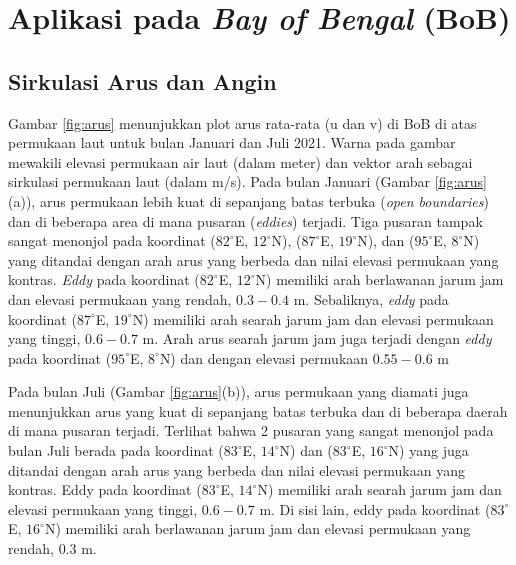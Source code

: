 \vspace{1.5pc}
\section[Aplikasi pada \textit{Bay of Bengal} (BoB)]{Aplikasi pada \textit{Bay of Bengal}  (BoB)}
\begin{spacing}{1.5}
\vspace{-1pc}
\subsection[Sirkulasi Arus dan Angin]{Sirkulasi Arus dan Angin}
	
	Gambar \ref{fig:arus} menunjukkan plot arus rata-rata (u dan v) di BoB di atas permukaan laut untuk bulan Januari dan Juli 2021. Warna pada gambar mewakili elevasi permukaan air laut (dalam meter) dan vektor arah sebagai sirkulasi permukaan laut (dalam m/s). Pada bulan Januari (Gambar \ref{fig:arus}(a)), arus permukaan lebih kuat di sepanjang batas terbuka (\textit{open boundaries}) dan di beberapa area di mana pusaran (\textit{eddies}) terjadi. Tiga pusaran tampak sangat menonjol pada koordinat ($82^\circ$E, $12^\circ$N), ($87^\circ$E, $19^\circ$N), dan ($95^\circ$E, $8^\circ$N) yang ditandai dengan arah arus yang berbeda dan nilai elevasi permukaan yang kontras. \textit{Eddy} pada koordinat ($82^\circ$E, $12^\circ$N) memiliki arah berlawanan jarum jam dan elevasi permukaan yang rendah, $0.3 - 0.4$ m. Sebaliknya, \textit{eddy} pada koordinat ($87^\circ$E, $19^\circ$N) memiliki arah searah jarum jam dan elevasi permukaan yang tinggi, $0.6 - 0.7$ m. Arah arus searah jarum jam juga terjadi dengan \textit{eddy} pada koordinat ($95^\circ$E, $8^\circ$N) dan dengan elevasi permukaan $0.55 - 0.6$ m
	
	Pada bulan Juli (Gambar \ref{fig:arus}(b)), arus permukaan yang diamati juga menunjukkan arus yang kuat di sepanjang batas terbuka dan di beberapa daerah di mana pusaran terjadi. Terlihat bahwa 2 pusaran yang sangat menonjol pada bulan Juli berada pada koordinat ($83^\circ$E, $14^\circ$N) dan ($83^\circ$E, $16^\circ$N) yang juga ditandai dengan arah arus yang berbeda dan nilai elevasi permukaan yang kontras. Eddy pada koordinat ($83^\circ$E, $14^\circ$N) memiliki arah searah jarum jam dan elevasi permukaan yang tinggi, $0.6 - 0.7$ m. Di sisi lain, eddy pada koordinat ($83^\circ$E, $16^\circ$N) memiliki arah berlawanan jarum jam dan elevasi permukaan yang rendah, $0.3$ m.
	

\end{spacing}
